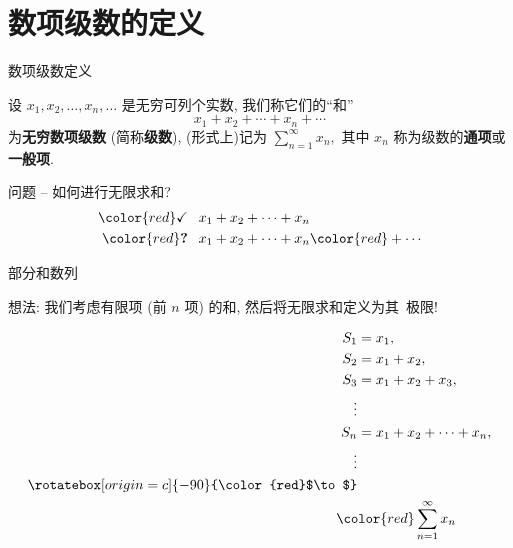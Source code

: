 
\section[定义]{数项级数的定义}


\begin{frame}{数项级数定义}

设 $x_1, x_2, \dots, x_n, \dots$ 是无穷可列个实数, 我们称它们的{\color{red}“和”}
\[x_1 + x_2 + \cdots + x_n + \cdots\]
为\textbf{无穷数项级数} (简称\textbf{级数}), (形式上)记为 $\sum\limits_{n=1}^\infty x_n,$ 其中 $x_n$ 称为级数的\textbf{通项}或\textbf{一般项}.

\pause
\vspace*{0.5em}

\begin{block}{{\larger 问题} -- 如何进行无限求和?}
\vspace*{-1em}
{\larger[1]
\begin{align*}
{\color{red}\checkmark} & \phantom{+} x_1 + x_2 + \cdots + x_n \\
{\color{red}\textbf{?}} & \phantom{+} x_1 + x_2 + \cdots + x_n {\color{red} + \cdots}
\end{align*}
}
\end{block}

\end{frame}


\begin{frame}{部分和数列}

想法: 我们考虑有限项 (前 $n$ 项) 的和, 然后将无限求和定义为其~{\color{red}极限}!

\pause

\begin{align*}
S_1 & = x_1, \\
S_2 & = x_1 + x_2, \\
S_3 & = x_1 + x_2 + x_3, \\
\vdots & \\
S_n & = x_1 + x_2 + \cdots + x_n, \\
\vdots \\
\rotatebox[origin=c]{-90}{\color{red}$\to$} \\
& \hspace*{-1.5em} {\color{red}\sum\limits_{n=1}^\infty x_n}
\end{align*}

\end{frame}

